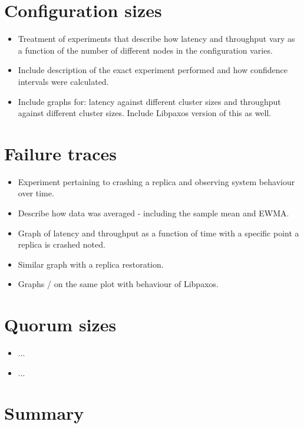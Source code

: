 \section{Configuration sizes}
\begin{itemize}
   \item Treatment of experiments that describe how latency and throughput vary as a function of the number of different nodes in the configuration varies.
      \item Include description of the exact experiment performed and how confidence intervals were calculated.
   \item Include graphs for: latency against different cluster sizes and throughput against different cluster sizes. Include Libpaxos version of this as well.
\end{itemize}

\section{Failure traces}
\begin{itemize}
  \item Experiment pertaining to crashing a replica and observing system behaviour over time.
  \item Describe how data was averaged - including the sample mean and EWMA.
  \item Graph of latency and throughput as a function of time with a specific point a replica is crashed noted.
  \item Similar graph with a replica restoration.
  \item Graphs / on the same plot with behaviour of Libpaxos.
\end{itemize}

\section{Quorum sizes}
\begin{itemize}
  \item ...
  \item ...
\end{itemize}

\section{Summary}

